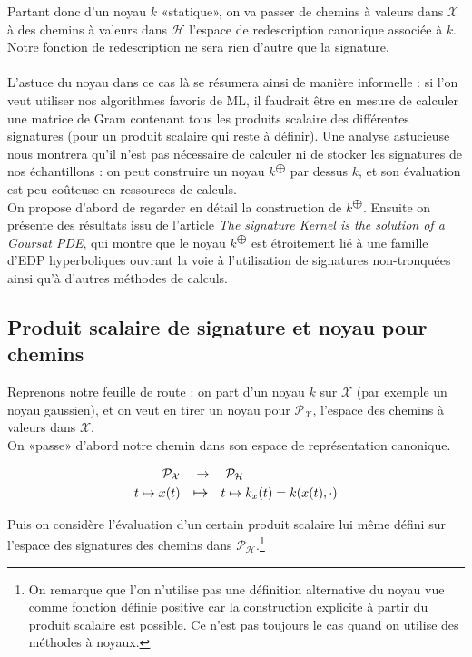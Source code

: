 \documentclass[10pt,a4paper]{article}
\begin{document}
Partant donc d'un noyau $k$ «statique», on va passer de chemins à valeurs dans $\mathcal{X}$ à des chemins à valeurs dans $\mathcal{H}$ l'espace de redescription canonique associée à $k$. Notre fonction de redescription ne sera rien d'autre que la signature. \\ \\
L'astuce du noyau dans ce cas là se résumera ainsi de manière informelle : si l'on veut utiliser nos algorithmes favoris de ML, il faudrait être en mesure de calculer une matrice de Gram contenant tous les produits scalaire des différentes signatures (pour un produit scalaire qui reste à définir). Une analyse astucieuse nous montrera qu'il n'est pas nécessaire de calculer ni de stocker les signatures de nos échantillons : on peut construire un noyau $k^{\bigoplus}$ par dessus $k$, et son évaluation est peu coûteuse en ressources de calculs. \\

On propose d'abord de regarder en détail la construction de $k^{\bigoplus}$. Ensuite on présente des résultats issu de l'article \textit{The signature Kernel is the solution of a Goursat PDE}, qui montre que le noyau $k^{\bigoplus}$ est étroitement lié à une famille d'EDP hyperboliques ouvrant la voie à l'utilisation de signatures non-tronquées ainsi qu'à d'autres méthodes de calculs.

\subsection{Produit scalaire de signature et noyau pour chemins}

Reprenons notre feuille de route : on part d'un noyau $k$ sur $\mathcal{X}$ (par exemple un noyau gaussien), et on veut en tirer un noyau pour $\mathcal{P}_{\mathcal{X}}$, l'espace des chemins à valeurs dans $\mathcal{X}$. \\

On «passe» d'abord notre chemin dans son espace de représentation canonique.

\begin{align*}
\mathcal{P}_{\mathcal{X}} & \quad \rightarrow \quad  \mathcal{P}_{\mathcal{H}}\\
t \mapsto x(t) & \quad \mathlarger{\mapsto} \quad t \mapsto k_x (t)  = k(x(t), \cdot ) \\
\end{align*}

Puis on considère l'évaluation d'un certain produit scalaire lui même défini sur l'espace des signatures des chemins dans $\mathcal{P}_{\mathcal{H}}$.\footnote{On remarque que l'on n'utilise pas une définition alternative du noyau vue comme fonction définie positive car la construction explicite à partir du produit scalaire est possible. Ce n'est pas toujours le cas quand on utilise des méthodes à noyaux.}
\end{document}
